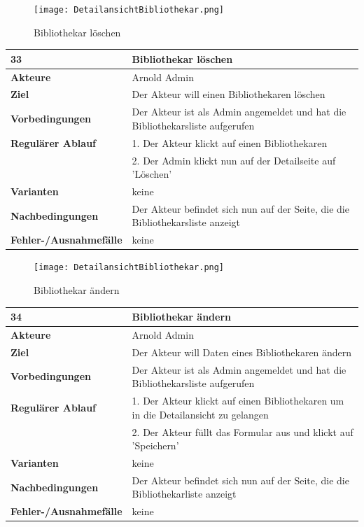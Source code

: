\documentclass[fontsize=12pt,paper=a4,twoside]{scrartcl}
\begin{document}
\begin{figure}
	[H] \caption{Bibliothekar löschen} 
	\texttt{[image: DetailansichtBibliothekar.png]} \label{pic:BibLoeschen} 
\end{figure}
\begin{table}
	[H] \label{33} 
	\begin{tabular}
		{|l|p{10cm}|} \hline \textbf{33} & \textbf{Bibliothekar löschen} \\
		\hline \textbf{Akteure} & Arnold Admin\\
		\hline \textbf{Ziel} & Der Akteur will einen Bibliothekaren löschen \\
		\hline \textbf{Vorbedingungen} & Der Akteur ist als Admin angemeldet und hat die Bibliothekarsliste aufgerufen\\\hline \textbf{Regulärer Ablauf} & 1. Der Akteur klickt auf einen Bibliothekaren \\
		&2. Der Admin klickt nun auf der Detailseite auf 'Löschen'\\
		\hline \textbf{Varianten} & keine \\
		\hline \textbf{Nachbedingungen} & Der Akteur befindet sich nun auf der Seite, die die Bibliothekarsliste anzeigt\\
		\hline \textbf{Fehler-/Ausnahmefälle} & keine\\
		\hline 
	\end{tabular}
\end{table}
\begin{figure}
	[H] \caption{Bibliothekar ändern} 
	\texttt{[image: DetailansichtBibliothekar.png]} \label{pic:BibAendern} 
\end{figure}
\begin{table}
	[H] \label{34} 
	\begin{tabular}
		{|l|p{10cm}|} \hline \textbf{34} & \textbf{Bibliothekar ändern} \\
		\hline \textbf{Akteure} & Arnold Admin\\
		\hline \textbf{Ziel} & Der Akteur will Daten eines Bibliothekaren ändern \\
		\hline \textbf{Vorbedingungen} & Der Akteur ist als Admin angemeldet und hat die Bibliothekarsliste aufgerufen \\
		\hline \textbf{Regulärer Ablauf} & 1. Der Akteur klickt auf einen Bibliothekaren um in die Detailansicht zu gelangen\\
		&2. Der Akteur füllt das Formular aus und klickt auf 'Speichern'\\
		\hline \textbf{Varianten} & keine \\
		\hline \textbf{Nachbedingungen} & Der Akteur befindet sich nun auf der Seite, die die Bibliothekarliste anzeigt\\
		\hline \textbf{Fehler-/Ausnahmefälle} & keine\\
		\hline 
	\end{tabular}
\end{table}
\end{document}
